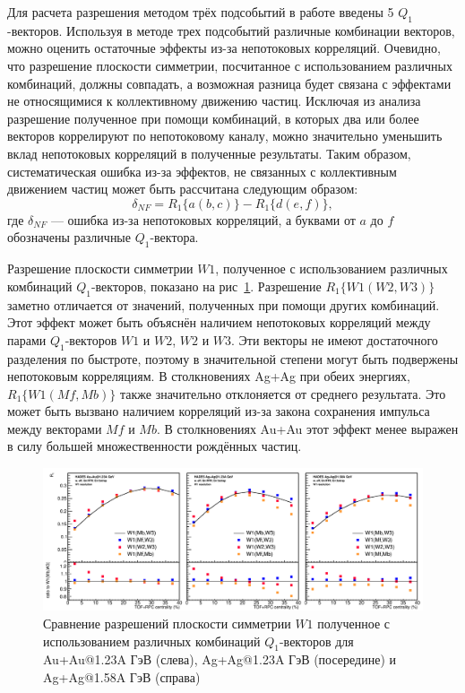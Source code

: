 Для расчета разрешения методом трёх подсобытий в работе введены 5 $Q_1$-векторов. 
Используя в методе трех подсобытий различные комбинации векторов, можно оценить остаточные эффекты из-за непотоковых корреляций. 
Очевидно, что разрешение плоскости симметрии, посчитанное с использованием различных комбинаций, должны совпадать, а возможная разница будет связана с эффектами не относящимися к коллективному движению частиц.
Исключая из анализа разрешение полученное при помощи комбинаций, в которых два или более векторов коррелируют по непотоковому каналу, можно значительно уменьшить вклад непотоковых корреляций в полученные результаты.
Таким образом, систематическая ошибка из-за эффектов, не связанных с коллективным движением частиц может быть рассчитана следующим образом:
\begin{equation}
    \delta_{NF} = R_1\{a(b,c)\} - R_1\{d(e,f)\},
\end{equation}
где $\delta_{NF}$ --- ошибка из-за непотоковых корреляций, а буквами от $a$ до $f$ обозначены различные $Q_1$-вектора.

Разрешение плоскости симметрии $W1$, полученное с использованием различных комбинаций $Q_1$-векторов, показано на рис~\ref{fig:hades_w1_combinations}.
Разрешение $R_1\{W1(W2,W3)\}$ заметно отличается от значений, полученных при помощи других комбинаций. 
Этот эффект может быть объяснён наличием непотоковых корреляций между парами $Q_1$-векторов $W1$ и $W2$, $W2$ и $W3$.
Эти векторы не имеют достаточного разделения по быстроте, поэтому в значительной степени могут быть подвержены непотоковым корреляциям. 
В столкновениях Ag+Ag при обеих энергиях, $R_1\{W1(Mf,Mb)\}$ также значительно отклоняется от среднего результата. 
Это может быть вызвано наличием корреляций из-за закона сохранения импульса между векторами $Mf$ и $Mb$. 
В столкновениях Au+Au этот эффект менее выражен в силу большей множественности рождённых частиц.
%
\begin{figure}[ht]
\begin{center}
\includegraphics[width=0.75\linewidth]{images/W1_combinations.png}
\caption{Сравнение разрешений плоскости симметрии $W1$ полученное с использованием различных комбинаций $Q_1$-векторов для Au+Au@1.23A ГэВ (слева), Ag+Ag@1.23A ГэВ (посередине) и Ag+Ag@1.58A ГэВ (справа)}
\label{fig:hades_w1_combinations}
\end{center}
\end{figure}

